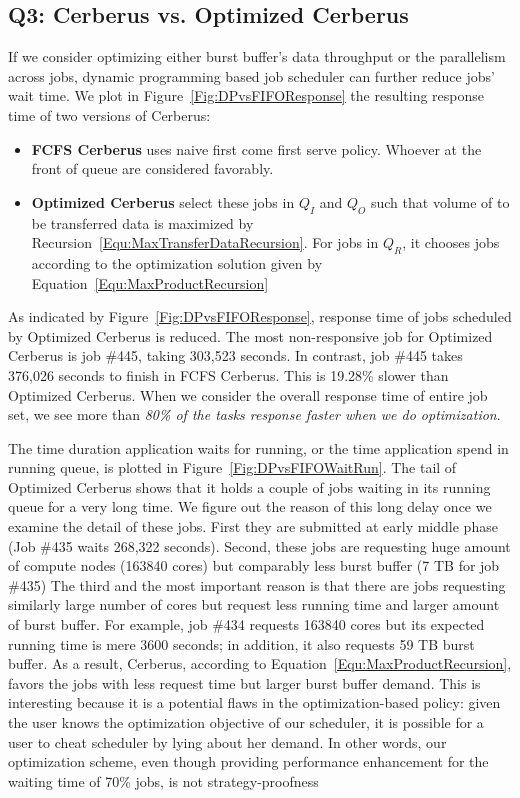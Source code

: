 \subsection{Q3: Cerberus vs. Optimized Cerberus}
If we consider optimizing either burst buffer's data throughput or the parallelism across jobs,
dynamic programming based job scheduler can further reduce jobs' wait time.
We plot in Figure~\ref{Fig:DPvsFIFOResponse} the resulting response time of
two versions of Cerberus:
\begin{itemize}
        \item \textbf{FCFS Cerberus} uses naive first come first serve policy.
                Whoever at the front of queue are considered favorably.
        \item \textbf{Optimized Cerberus} select these jobs in $Q_I$ and $Q_O$
                such that volume of to be transferred data
                is maximized by Recursion~\ref{Equ:MaxTransferDataRecursion}.
                For jobs in $Q_R$, it chooses jobs according to the optimization solution
                given by Equation~\ref{Equ:MaxProductRecursion}
\end{itemize}
As indicated by Figure~\ref{Fig:DPvsFIFOResponse}, response time of
jobs scheduled by Optimized Cerberus is reduced.
The most non-responsive job for Optimized Cerberus is job \#445,
taking 303,523 seconds.
In contrast, job \#445 takes 376,026 seconds to finish in FCFS Cerberus.
This is 19.28\% slower than Optimized Cerberus.
When we consider the overall response time of entire job set,
we see more than \textit{80\% of the tasks response faster when we do optimization}.

The time duration application waits for running,
or the time application spend in running queue,
is plotted in Figure~\ref{Fig:DPvsFIFOWaitRun}.
The tail of Optimized Cerberus shows that it holds a couple of jobs waiting
in its running queue for a very long time.
We figure out the reason of this long delay once we examine the detail of these jobs.
First they are submitted at early middle phase (Job \#435 waits 268,322 seconds).
Second, these jobs are requesting huge amount of compute nodes (163840 cores)
but comparably less burst buffer (7 TB for job \#435)
The third and the most important reason is that there are jobs requesting similarly
large number of cores but request less running time and larger amount of burst buffer.
For example, job \#434 requests 163840 cores
but its expected running time is mere 3600 seconds;
in addition, it also requests 59 TB burst buffer.
As a result, Cerberus, according to Equation~\ref{Equ:MaxProductRecursion},
favors the jobs with less request time but larger burst buffer demand.
This is interesting because it is a potential flaws in the optimization-based policy:
given the user knows the optimization objective of our scheduler,
it is possible for a user to cheat scheduler by lying about her demand.
In other words, our optimization scheme, even though providing performance enhancement
for the waiting time of 70\% jobs, is not strategy-proofness\cite{Ghodsi:NSDI:2011}


